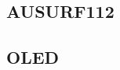 \documentclass[a4paper,12pt]{article}
\begin{document}
\begin{appendices}
\subsection{AUSURF112}\label{app:Ausurf112}


\subsection{OLED}\label{app:Oled}


\end{appendices}
\end{document}
